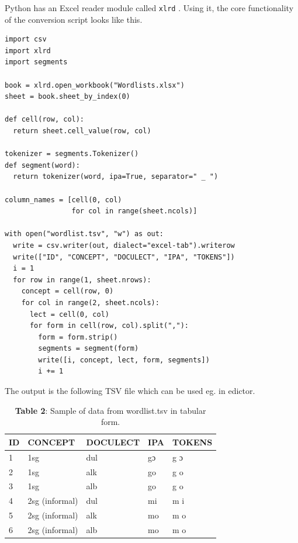 \documentclass[
  a4paper,
  14pt,
  oneside,
  tablecaptionabove
]{scrbook}
\begin{document}
Python has an Excel reader module called \lstinline!xlrd! . Using it,
the core functionality of the conversion script looks like this.

\begin{lstlisting}[basicstyle=\small]
import csv
import xlrd
import segments

book = xlrd.open_workbook("Wordlists.xlsx")
sheet = book.sheet_by_index(0)

def cell(row, col):
  return sheet.cell_value(row, col)

tokenizer = segments.Tokenizer()
def segment(word):
  return tokenizer(word, ipa=True, separator=" _ ")

column_names = [cell(0, col)
                for col in range(sheet.ncols)]

with open("wordlist.tsv", "w") as out:
  write = csv.writer(out, dialect="excel-tab").writerow
  write(["ID", "CONCEPT", "DOCULECT", "IPA", "TOKENS"])
  i = 1
  for row in range(1, sheet.nrows):
    concept = cell(row, 0)
    for col in range(2, sheet.ncols):
      lect = cell(0, col)
      for form in cell(row, col).split(","):
        form = form.strip()
        segments = segment(form)
        write([i, concept, lect, form, segments])
        i += 1
\end{lstlisting}

The output is the following TSV file which can be used eg. in edictor.


\begin{table}[h]
\centering
\begin{tabular}{@{}lllll@{}}
\toprule
ID & CONCEPT        & DOCULECT & IPA & TOKENS \\ \midrule
1  & 1sg            & dul      & gɔ  & g ɔ    \\
2  & 1sg            & alk      & go  & g o    \\
3  & 1sg            & alb      & go  & g o    \\
4  & 2sg (informal) & dul      & mi  & m i    \\
5  & 2sg (informal) & alk      & mo  & m o    \\
6  & 2sg (informal) & alb      & mo  & m o    \\ \bottomrule
\end{tabular}
\caption*{\small \textbf{Table 2}: Sample of data from wordlist.tsv in tabular form.}
\label{tab:my-table}
\end{table}
\end{document}
